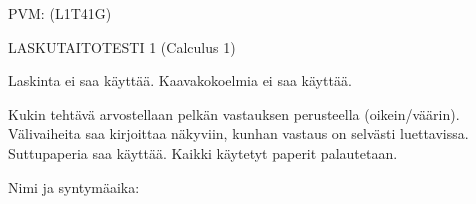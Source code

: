 \documentclass[finnish, a4paper, 12pt]{article}
\begin{document}
	
	
		PVM: \underline{\phantom{mm.mm.}}
		\hfill
		(L1T41G)	%
	
	\begin{center}
		{\large
			LASKUTAITOTESTI 1 (Calculus 1)}
	\end{center}
	
	Laskinta ei saa käyttää. Kaavakokoelmia ei saa käyttää.
	
	Kukin tehtävä arvostellaan pelkän vastauksen perusteella (oikein/väärin).
	Välivaiheita saa kirjoittaa näkyviin, kunhan vastaus on selvästi luettavissa.
	Suttupaperia saa käyttää. Kaikki käytetyt paperit palautetaan.
	
\vspace{12pt}
Nimi ja syntymäaika: \phantom{m} \hrulefill
\vspace{8pt}
	
\end{document}
